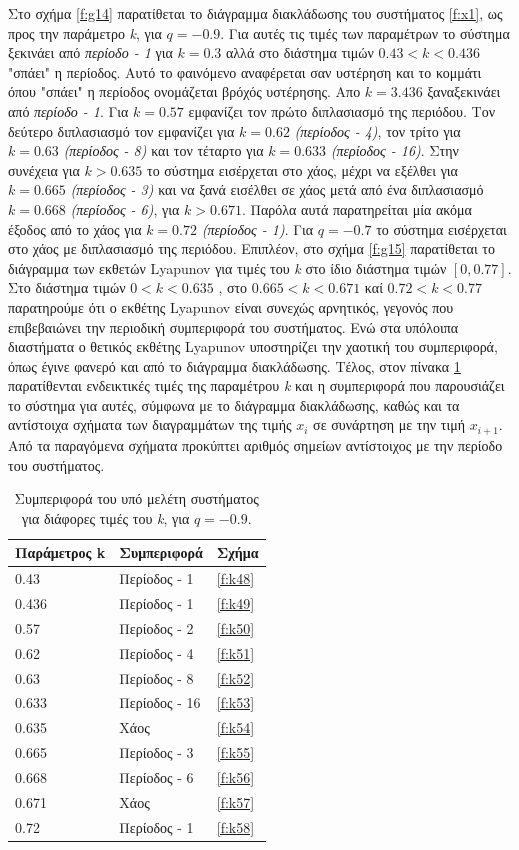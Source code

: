 Στο σχήμα \ref{f:g14} παρατίθεται το διάγραμμα διακλάδωσης του συστήματος \ref{f:x1}, ως προς την παράμετρο \emph{k}, για $q =- 0.9$. Για αυτές τις τιμές των παραμέτρων το σύστημα ξεκινάει από \emph{περίοδο - 1} για $k=0.3$ αλλά στο διάστημα τιμών $0.43<k<0.436$ "σπάει" η περίοδος. Αυτό το φαινόμενο αναφέρεται σαν υστέρηση και το κομμάτι όπου "σπάει" η περίοδος ονομάζεται βρόχός υστέρησης. Απο $k=3.436$ ξαναξεκινάει από \emph{περίοδο - 1}. Για  $k = 0.57$ εμφανίζει τον πρώτο διπλασιασμό της περιόδου. Τον δεύτερο διπλασιασμό τον εμφανίζει για $k=0.62$ \emph{(περίοδος - 4)}, τον τρίτο για $k=0.63$ \emph{(περίοδος -   8)} και τον τέταρτο για $k=0.633$ \emph{(περίοδος - 16)}. Στην συνέχεια για $k>0.635$ το σύστημα εισέρχεται στο χάος, μέχρι να εξέλθει  για $k=0.665$ \emph{(περίοδος -   3)} και να ξανά εισέλθει σε χάος μετά από ένα διπλασιασμό $k=0.668$ \emph{(περίοδος -   6)}, για $k>0.671$. Παρόλα αυτά παρατηρείται μία ακόμα έξοδος από το χάος για $k=0.72$ \emph{(περίοδος -   1)}.
Για $q=-0.7$ το σύστημα εισέρχεται στο χάος με διπλασιασμό της περιόδου.
Επιπλέον, στο σχήμα \ref{f:g15} παρατίθεται το διάγραμμα των εκθετών Lyapunov για τιμές του \emph{k} στο ίδιο διάστημα τιμών $[0, 0.77]$.  Στο διάστημα τιμών   $0<k<0.635$ , στο $0.665<k<0.671$ καί $0.72<k<0.77$ παρατηρούμε ότι ο εκθέτης Lyapunov είναι συνεχώς αρνητικός, γεγονός που επιβεβαιώνει την περιοδική συμπεριφορά του συστήματος. Ενώ στα υπόλοιπα διαστήματα ο θετικός εκθέτης Lyapunov υποστηρίζει την χαοτική του συμπεριφορά, όπως έγινε φανερό και από το διάγραμμα διακλάδωσης.
Τέλος, στον πίνακα \ref{tab:abc4} παρατίθενται ενδεικτικές τιμές της παραμέτρου \emph{k} και η συμπεριφορά που παρουσιάζει το σύστημα για αυτές, σύμφωνα με το διάγραμμα διακλάδωσης, καθώς και τα αντίστοιχα σχήματα των διαγραμμάτων της τιμής \(x_i\) σε συνάρτηση με την τιμή \(x_{i+1}\). Από τα παραγόμενα σχήματα προκύπτει αριθμός σημείων αντίστοιχος με την περίοδο του συστήματος.

\begin{table}[h!]
	\centering
	\caption{ Συμπεριφορά του υπό μελέτη συστήματος για διάφορες τιμές του \emph{k}, για $q=-0.9$.}
	\label{tab:abc4}
	\begin{tabular}{l | l | l}
		Παράμετρος k & Συμπεριφορά & Σχήμα\\
		\hline
		0.43 &  Περίοδος -  1 & \ref{f:k48}\\
		0.436 &  Περίοδος -  1 & \ref{f:k49}\\
		0.57& Περίοδος -  2 & \ref{f:k50}\\
		0.62& Περίοδος -  4 & \ref{f:k51}\\
		0.63 &  Περίοδος -  8 & \ref{f:k52}\\
		0.633& Περίοδος -  16 & \ref{f:k53}\\
		0.635& Χάος & \ref{f:k54}\\
		0.665 & Περίοδος -  3 & \ref{f:k55}\\
		0.668 & Περίοδος -  6 & \ref{f:k56}\\
		0.671 & Χάος & \ref{f:k57}\\
		0.72 & Περίοδος -  1& \ref{f:k58}\\
	\end{tabular}
\end{table}

